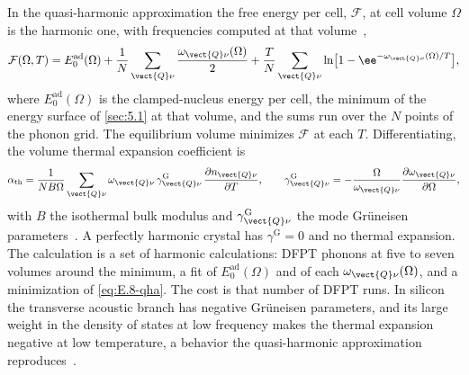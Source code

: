 In the quasi-harmonic approximation the free energy per cell, $\mathcal{F}$, at cell volume $\Omega$ is the harmonic one, with frequencies computed at that volume~\cite[Eq.~(4)]{baroni2010thermal},
\begin{equation}
  \mathcal{F}(\Omega,T) = E^{\mathrm{ad}}_0(\Omega) + \frac1N\sum_{\vect{Q}\nu}\frac{\omega_{\vect{Q}\nu}(\Omega)}{2} + \frac TN\sum_{\vect{Q}\nu}\ln\bigl[1 - \ee^{-\omega_{\vect{Q}\nu}(\Omega)/T}\bigr] ,
  \label{eq:E.8-qha}
\end{equation}
where $E^{\mathrm{ad}}_0(\Omega)$ is the clamped-nucleus energy per cell, the minimum of the energy surface of \cref{sec:5.1} at that volume, and the sums run over the $N$ points of the phonon grid. The equilibrium volume minimizes $\mathcal{F}$ at each $T$. Differentiating, the volume thermal expansion coefficient is
\begin{equation}
  \alpha_{\mathrm{th}} = \frac{1}{N B\Omega}\sum_{\vect{Q}\nu}\omega_{\vect{Q}\nu}\,\gamma^{\mathrm{G}}_{\vect{Q}\nu}\,\frac{\partial n_{\vect{Q}\nu}}{\partial T}, \qquad
  \gamma^{\mathrm{G}}_{\vect{Q}\nu} = -\frac{\Omega}{\omega_{\vect{Q}\nu}}\frac{\partial\omega_{\vect{Q}\nu}}{\partial\Omega} ,
  \label{eq:E.8-beta}
\end{equation}
with $B$ the isothermal bulk modulus and $\gamma^{\mathrm{G}}_{\vect{Q}\nu}$ the mode Grüneisen parameters~\cite[Eqs.~(6) and~(9)]{baroni2010thermal}. A perfectly harmonic crystal has $\gamma^{\mathrm{G}} = 0$ and no thermal expansion. The calculation is a set of harmonic calculations: DFPT phonons at five to seven volumes around the minimum, a fit of $E^{\mathrm{ad}}_0(\Omega)$ and of each $\omega_{\vect{Q}\nu}(\Omega)$, and a minimization of \cref{eq:E.8-qha}. The cost is that number of DFPT runs. In silicon the transverse acoustic branch has negative Grüneisen parameters, and its large weight in the density of states at low frequency makes the thermal expansion negative at low temperature, a behavior the quasi-harmonic approximation reproduces~\cite[Sect.~5.1]{baroni2010thermal}.

